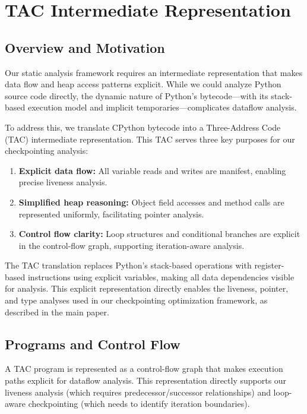 \section{TAC Intermediate Representation}
\label{sec:appendix-tac-ir}

\subsection{Overview and Motivation}

Our static analysis framework requires an intermediate representation that makes data flow and heap access patterns explicit. While we could analyze Python source code directly, the dynamic nature of Python's bytecode—with its stack-based execution model and implicit temporaries—complicates dataflow analysis. 

To address this, we translate CPython bytecode into a Three-Address Code (TAC) intermediate representation. This TAC serves three key purposes for our checkpointing analysis:
\begin{enumerate}
    \item \textbf{Explicit data flow:} All variable reads and writes are manifest, enabling precise liveness analysis.
    \item \textbf{Simplified heap reasoning:} Object field accesses and method calls are represented uniformly, facilitating pointer analysis.
    \item \textbf{Control flow clarity:} Loop structures and conditional branches are explicit in the control-flow graph, supporting iteration-aware analysis.
\end{enumerate}

The TAC translation replaces Python's stack-based operations with register-based instructions using explicit variables, making all data dependencies visible for analysis. This explicit representation directly enables the liveness, pointer, and type analyses used in our checkpointing optimization framework, as described in the main paper.

\subsection{Programs and Control Flow}

A TAC program is represented as a control-flow graph that makes execution paths explicit for dataflow analysis. This representation directly supports our liveness analysis (which requires predecessor/successor relationships) and loop-aware checkpointing (which needs to identify iteration boundaries).

